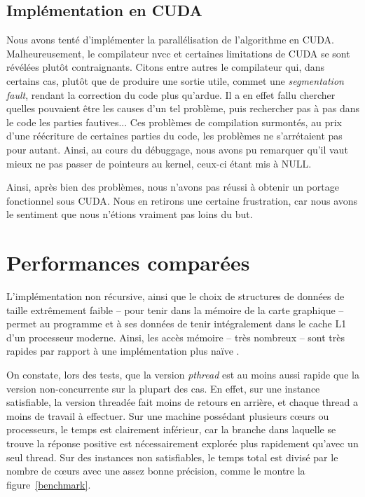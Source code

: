 \documentclass{article}
\newcommand{\cuda}{\textsc{CUDA}}
\begin{document}
\subsection{Implémentation en \cuda}
    Nous avons tenté d'implémenter la parallélisation de l'algorithme en \cuda. Malheureusement, le compilateur nvcc et certaines limitations de CUDA se sont révélées plutôt contraignants. Citons entre autres le compilateur qui, dans certains cas, plutôt que de produire une sortie utile, commet une \emph{segmentation fault}, rendant la correction du code plus qu'ardue. Il a en effet fallu chercher quelles pouvaient être les causes d'un tel problème, puis rechercher pas à pas dans le code les parties fautives... Ces problèmes de compilation surmontés, au prix d'une réécriture de certaines parties du code, les problèmes ne s'arrétaient pas pour autant. Ainsi, au cours du débuggage, nous avons pu remarquer qu'il vaut mieux ne pas passer de pointeurs au kernel, ceux-ci étant mis à NULL.

Ainsi, après bien des problèmes, nous n'avons pas réussi à obtenir un portage fonctionnel sous \cuda. Nous en retirons une certaine frustration, car nous avons le sentiment que nous n'étions vraiment pas loins du but.



\section{Performances comparées}
    L'implémentation non récursive, ainsi que le choix de structures de données de taille extrêmement faible -- pour tenir dans la mémoire de la carte graphique -- permet au programme et à ses données de tenir intégralement dans le cache L1 d'un processeur moderne. Ainsi, les accès mémoire -- très nombreux -- sont très rapides par rapport à une implémentation plus \og naïve \fg.

    On constate, lors des tests, que la version \emph{pthread} est au moins aussi rapide que la version non-concurrente sur la plupart des cas. En effet, sur une instance satisfiable, la version threadée fait moins de retours en arrière, et chaque thread a moins de travail à effectuer. Sur une machine possédant plusieurs cœurs ou processeurs, le temps est clairement inférieur, car la branche dans laquelle se trouve la réponse positive est nécessairement explorée plus rapidement qu'avec un seul thread. Sur des instances non satisfiables, le temps total est divisé par le nombre de cœurs avec une assez bonne précision, comme le montre la figure~\ref{benchmark}.
\end{document}

